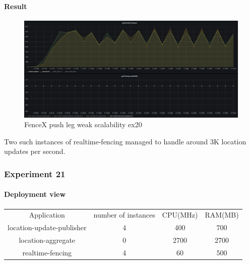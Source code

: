 \documentclass[a4]{report}
\begin{document}
    \paragraph{Result}
    \begin{figure}[ht]
        \caption{FenceX push leg weak scalability ex20}
        \label{fig:ex20}
        \includegraphics[scale=0.4]{images/evaluation/ex20-benchmarking-ongoing-1per10sec.png}
    \end{figure}

    Two such instances of realtime-fencing managed to handle around 3K location updates per second.


    \subsubsection{Experiment 21}
    \paragraph{Deployment view}
    \begin{center}
        \begin{tabular}{ c c c c }
            Application               &  number of instances     & CPU(MHz)  & RAM(MB)    \\
            location-update-publisher &          4               & 400       &   700      \\
            location-aggregate        &          0               & 2700      &   2700     \\
            realtime-fencing          &          4               & 60       &   500       \\
        \end{tabular}
    \end{center}
\end{document}
